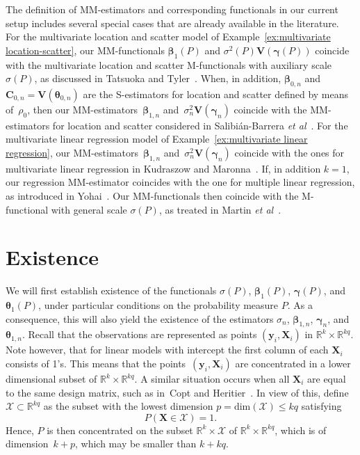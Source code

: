 \documentclass{article}
\numberwithin{equation}{section}
\theoremstyle{plain}
\newcommand{\R}{\mathbb{R}}
\newcommand{\bbeta}{\bm\beta}
\newcommand{\btheta}{\bm\theta}
\newcommand{\bgamma}{\bm\gamma}
\newcommand{\by}{\mathbf{y}}
\newcommand{\bX}{\mathbf{X}}
\newcommand{\bV}{\mathbf{V}}
\newcommand{\bC}{\mathbf{C}}
\begin{document}
The definition of MM-estimators and corresponding functionals in our current setup 
includes several special cases that are already available in the literature.
For the multivariate location and scatter model of Example~\ref{ex:multivariate location-scatter},
our MM-functionals $\bbeta_1(P)$ and $\sigma^2(P)\bV(\bgamma(P))$
coincide with the multivariate location and scatter M-functionals 
with auxiliary scale $\sigma(P)$, as discussed in Tatsuoka and Tyler~\cite{tatsuoka&tyler2000}.
When, in addition, $\bbeta_{0,n}$ and $\bC_{0,n}=\bV(\btheta_{0,n})$ are the S-estimators for location and scatter defined by means of~$\rho_0$,
then our MM-estimators~$\bbeta_{1,n}$ and~$\sigma_n^2\bV(\bgamma_n)$ coincide with the MM-estimators for location and scatter considered in Salibi\'an-Barrera \textit{et al}~\cite{SalibianBarrera-VanAelst-Willems2006}.
For the multivariate linear regression model of Example~\ref{ex:multivariate linear regression},
our MM-estimators~$\bbeta_{1,n}$ and~$\sigma_n^2\bV(\bgamma_n)$ coincide 
with the ones for multivariate linear regression in Kudraszow and Maronna~\cite{kudraszow-maronna2011}.
If, in addition $k=1$, our regression MM-estimator coincides with the one for multiple linear regression, as introduced in Yohai~\cite{yohai1987}.
Our MM-functionals then coincide with the M-functional with general scale $\sigma(P)$,
as treated in Martin \textit{et al}~\cite{martin-yohai-zamar1989}. 

\section{Existence}
\label{sec:existence}
We will first establish existence of the functionals $\sigma(P)$, $\bbeta_1(P)$, $\bgamma(P)$, and $\btheta_1(P)$,
under particular conditions on the probability measure $P$.
As a consequence, this will also yield the existence of the estimators $\sigma_n$, $\bbeta_{1,n}$, $\bgamma_n$, and $\btheta_{1,n}$.
Recall that the observations are represented as points $(\by_i,\bX_i)$ in $\R^k\times\R^{kq}$.
Note however, that for linear models with intercept the first column of each $\bX_i$ consists of 1's.
This means that the points~$(\by_i,\bX_i)$ are concentrated in a lower dimensional subset of $\R^k\times\R^{kq}$.
A similar situation occurs when all $\bX_i$ are equal to the same design matrix, such as in~Copt and Heritier~\cite{copt&heritier2007}.
In view of this, define $\mathcal{X}\subset\R^{kq}$ as the subset with the lowest dimension
$p=\text{dim}(\mathcal{X})\leq kq$ satisfying
\begin{equation}
\label{def:Xspace}
P(\bX\in \mathcal{X})=1.
\end{equation}
Hence, $P$ is then concentrated on the subset $\R^k\times \mathcal{X}$ of $\R^k\times\R^{kq}$, which
is of dimension~$k+p$, which may be smaller than $k+kq$.
\end{document}

